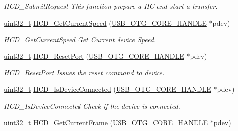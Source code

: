 \begin{DoxyCompactItemize}
\begin{DoxyCompactList}\small\item\em H\-C\-D\-\_\-\-Submit\-Request This function prepare a H\-C and start a transfer. \end{DoxyCompactList}\item 
\hyperlink{stdint_8h_a435d1572bf3f880d55459d9805097f62}{uint32\-\_\-t} \hyperlink{group___u_s_b___h_c_d___exported___functions_prototype_gaaf30c6c67be1f72ff55f14fbf69eec93}{H\-C\-D\-\_\-\-Get\-Current\-Speed} (\hyperlink{group___u_s_b___c_o_r_e___exported___types_gaf76054c11eb8a3367907aad7ae700e80}{U\-S\-B\-\_\-\-O\-T\-G\-\_\-\-C\-O\-R\-E\-\_\-\-H\-A\-N\-D\-L\-E} $\ast$pdev)
\begin{DoxyCompactList}\small\item\em H\-C\-D\-\_\-\-Get\-Current\-Speed Get Current device Speed. \end{DoxyCompactList}\item 
\hyperlink{stdint_8h_a435d1572bf3f880d55459d9805097f62}{uint32\-\_\-t} \hyperlink{group___u_s_b___h_c_d___exported___functions_prototype_ga9cdf7e999163ca125c1fdecc5ef0e450}{H\-C\-D\-\_\-\-Reset\-Port} (\hyperlink{group___u_s_b___c_o_r_e___exported___types_gaf76054c11eb8a3367907aad7ae700e80}{U\-S\-B\-\_\-\-O\-T\-G\-\_\-\-C\-O\-R\-E\-\_\-\-H\-A\-N\-D\-L\-E} $\ast$pdev)
\begin{DoxyCompactList}\small\item\em H\-C\-D\-\_\-\-Reset\-Port Issues the reset command to device. \end{DoxyCompactList}\item 
\hyperlink{stdint_8h_a435d1572bf3f880d55459d9805097f62}{uint32\-\_\-t} \hyperlink{group___u_s_b___h_c_d___exported___functions_prototype_ga74595e1854638eae4be812d804a4fe1b}{H\-C\-D\-\_\-\-Is\-Device\-Connected} (\hyperlink{group___u_s_b___c_o_r_e___exported___types_gaf76054c11eb8a3367907aad7ae700e80}{U\-S\-B\-\_\-\-O\-T\-G\-\_\-\-C\-O\-R\-E\-\_\-\-H\-A\-N\-D\-L\-E} $\ast$pdev)
\begin{DoxyCompactList}\small\item\em H\-C\-D\-\_\-\-Is\-Device\-Connected Check if the device is connected. \end{DoxyCompactList}\item 
\hyperlink{stdint_8h_a435d1572bf3f880d55459d9805097f62}{uint32\-\_\-t} \hyperlink{group___u_s_b___h_c_d___exported___functions_prototype_ga3be73e419f4919980c1f6da01b179bee}{H\-C\-D\-\_\-\-Get\-Current\-Frame} (\hyperlink{group___u_s_b___c_o_r_e___exported___types_gaf76054c11eb8a3367907aad7ae700e80}{U\-S\-B\-\_\-\-O\-T\-G\-\_\-\-C\-O\-R\-E\-\_\-\-H\-A\-N\-D\-L\-E} $\ast$pdev)

\end{DoxyCompactItemize}
